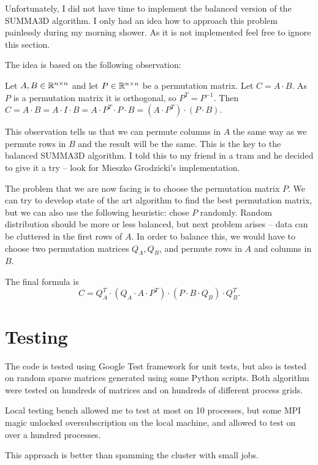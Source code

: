 \documentclass[a4paper,12pt]{article}
\begin{document}
    Unfortunately, I did not have time to implement the balanced version of the SUMMA3D algorithm.
    I only had an idea how to approach this problem painlessly during my morning shower.
    As it is not implemented feel free to ignore this section.

    The idea is based on the following observation:

    Let $A, B \in \mathbb{R}^{n \times n}$ and let $P \in \mathbb{R}^{n \times n}$ be a permutation matrix.
    Let $C = A \cdot B$. As $P$ is a permutation matrix it is orthogonal, so $P^T = P^{-1}$.
    Then $C = A \cdot B = A \cdot I \cdot B = A \cdot P^T \cdot P \cdot B = (A \cdot P^T) \cdot (P \cdot B)$.

    This observation tells us that we can permute columns in $A$ the same way as we permute
    rows in $B$ and the result will be the same. This is the key to the balanced SUMMA3D algorithm.
    I told this to my friend in a tram and he decided to give it a try -- look for
    Mieszko Grodzicki's implementation.

    The problem that we are now facing is to choose the permutation matrix $P$.
    We can try to develop state of the art algorithm to find the best permutation matrix,
    but we can also use the following heuristic: chose $P$ randomly.
    Random distribution should be more or less balanced,
    but next problem arises -- data can be cluttered in the first rows of $A$.
    In order to balance this, we would have to choose two permutation matrices $Q_A, Q_B$,
    and permute rows in $A$ and columns in $B$.

    The final formula is
    $$
    C = Q_A^T \cdot (Q_A \cdot A \cdot P^T) \cdot (P \cdot B \cdot Q_B) \cdot Q_B^T.
    $$

    \section{ Testing }

    The code is tested using Google Test framework for unit tests,
    but also is tested on random sparse matrices generated using some
    Python scripts. Both algorithm were tested on hundreds of matrices
    and on hundreds of different process grids.

    Local testing bench allowed me to test at most on 10 processes,
    but some MPI magic unlocked oversubscription on the local machine,
    and allowed to test on over a hundred processes.

    This approach is better than spamming the cluster with small jobs.
\end{document}
